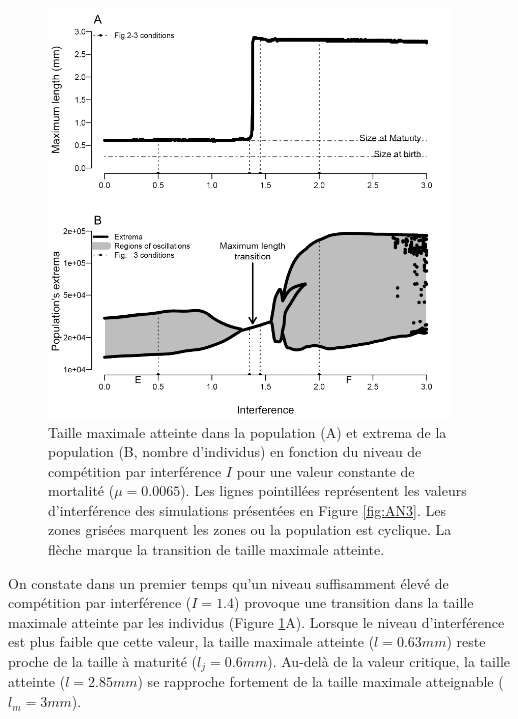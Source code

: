 \begin{figure}[!ht]
\begin{center}
\includegraphics[width=0.95\textwidth]{1_CorpsDeThese/Resumes/Fig/AN02}
\caption[Bifurcation sur le
niveau d'interférence]{Taille maximale atteinte dans la population (A) et extrema
de la population (B, nombre d'individus) en fonction du niveau de compétition par interférence $I$ pour une
valeur constante de mortalité ($\mu = 0.0065$). Les lignes pointillées
représentent les valeurs d'interférence des simulations présentées en Figure
\ref{fig:AN3}. Les zones grisées marquent les zones ou la population est
cyclique. La flèche marque la transition de taille maximale atteinte.}
\label{fig:AN2}
\end{center}
\end{figure}

On constate dans un premier temps qu'un niveau suffisamment élevé de compétition
par interférence ($I=1.4$) provoque une transition dans la taille maximale
atteinte par les individus (Figure \ref{fig:AN2}A). Lorsque le niveau
d'interférence est plus faible que cette valeur, la taille maximale atteinte
($l=0.63mm$) reste proche de la taille à maturité ($l_j=0.6mm$). Au-delà de la
valeur critique, la taille atteinte ($l=2.85mm$) se rapproche fortement de la
taille maximale atteignable ($l_m=3mm$).

